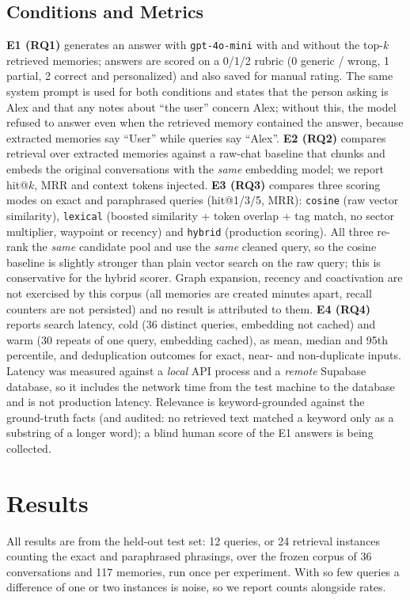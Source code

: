 \documentclass[conference]{IEEEtran}
\begin{document}
\subsection{Conditions and Metrics}
\textbf{E1 (RQ1)} generates an answer with \texttt{gpt-4o-mini} with and without
the top-$k$ retrieved memories; answers are scored on a 0/1/2 rubric (0 generic
/ wrong, 1 partial, 2 correct and personalized) and also saved for manual
rating. The same system prompt is used for both conditions and states that the
person asking is Alex and that any notes about ``the user'' concern Alex; without
this, the model refused to answer even when the retrieved memory contained the
answer, because extracted memories say ``User'' while queries say ``Alex''.
\textbf{E2 (RQ2)} compares retrieval over extracted memories against a
raw-chat baseline that chunks and embeds the original conversations with the
\emph{same} embedding model; we report hit@$k$, MRR and context tokens injected.
\textbf{E3 (RQ3)} compares three scoring modes on exact and paraphrased queries
(hit@1/3/5, MRR): \texttt{cosine} (raw vector similarity), \texttt{lexical}
(boosted similarity + token overlap + tag match, no sector multiplier, waypoint
or recency) and \texttt{hybrid} (production scoring). All three re-rank the
\emph{same} candidate pool and use the \emph{same} cleaned query, so the cosine
baseline is slightly stronger than plain vector search on the raw query; this is
conservative for the hybrid scorer. Graph expansion, recency and coactivation are
not exercised by this corpus (all memories are created minutes apart, recall
counters are not persisted) and no result is attributed to them. \textbf{E4 (RQ4)} reports search
latency, cold (36 distinct queries, embedding not cached) and warm (30 repeats of
one query, embedding cached), as mean, median and 95th percentile, and
deduplication outcomes for exact, near- and non-duplicate inputs. Latency was
measured against a \emph{local} API process and a \emph{remote} Supabase
database, so it includes the network time from the test machine to the database
and is not production latency. Relevance is keyword-grounded against the
ground-truth facts (and audited: no retrieved text matched a keyword only as a
substring of a longer word); a blind human score of the E1 answers is being
collected.

\section{Results}\label{sec:results}
All results are from the held-out test set: 12 queries, or 24 retrieval
instances counting the exact and paraphrased phrasings, over the frozen corpus of
36 conversations and 117 memories, run once per experiment. With so few queries a
difference of one or two instances is noise, so we report counts alongside rates.
\end{document}
